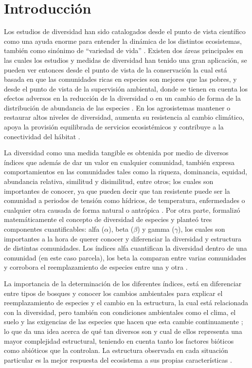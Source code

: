 \documentclass[conference,final,12pt,]{IEEEtran}
\begin{document}
\hypertarget{introducciuxf3n}{%
\section{Introducción}\label{introducciuxf3n}}

Los estudios de diversidad han sido catalogados desde el punto de vista
científico como una ayuda enorme para entender la dinámica de los
distintos ecosistemas, también como sinónimo de ``variedad de vida''
\citep{A}. Existen dos áreas principales en las cuales los estudios y
medidas de diversidad han tenido una gran aplicación, se pueden ver
entonces desde el punto de vista de la conservación la cual está basada
en que las comunidades ricas en especies son mejores que las pobres, y
desde el punto de vista de la supervisión ambiental, donde se tienen en
cuenta los efectos adversos en la reducción de la diversidad o en un
cambio de forma de la distribución de abundancia de las especies
\citep{B}. En los agrosistemas mantener o restaurar altos niveles de
diversidad, aumenta su resistencia al cambio climático, apoya la
provisión equilibrada de servicios ecosistémicos y contribuye a la
conectividad del hábitat \citep{C}.

La diversidad como una medida tangible es obtenida por medio de diversos
índices que además de dar un valor en cualquier comunidad, también
expresa comportamientos en las comunidades tales como la riqueza,
dominancia, equidad, abundancia relativa, similitud y disimilitud, entre
otros; los cuales son importantes de conocer, ya que pueden decir que
tan resistente puede ser la comunidad a periodos de tensión como
hídricos, de temperatura, enfermedades o cualquier otra causada de forma
natural o antrópica \citep{D}. Por otra parte, \citep{E} formalizó
matemáticamente el concepto de diversidad de especies y planteó tres
componentes cuantificables: alfa (\(\alpha\)), beta (\(\beta\)) y gamma
(\(\gamma\)), los cuales son importantes a la hora de querer conocer y
diferenciar la diversidad y estructura de distintas comunidades. Los
índices alfa cuantifican la diversidad dentro de una comunidad (en este
caso parcela), los beta la comparan entre varias comunidades y corrobora
el reemplazamiento de especies entre una y otra \citep{G}.

La importancia de la determinación de los diferentes índices, está en
diferenciar entre tipos de bosques y conocer los cambios ambientales
para explicar el reemplazamiento de especies y el cambio en la
estructura, la cual está relacionada con la diversidad, pero también con
condiciones ambientales como el clima, el suelo\citep{H} y las exigencias
de las especies \citep{J} que hacen que esta cambie continuamente
\citep{I}; lo que da una idea acerca de qué tan diversos son y cual de
ellos representa una mayor complejidad estructural, teniendo en cuenta
tanto los factores bióticos como abióticos que la controlan. La
estructura observada en cada situación particular es la mejor respuesta
del ecosistema a sus propias características \citep{F}.
\end{document}
